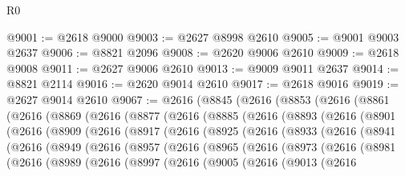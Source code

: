 \begin{lexlean}{R0}
\begin{coremodule}
@9001 := @2618 @9000
@9003 := @2627 @8998 @2610
@9005 := @9001 @9003 @2637
@9006 := @8821 @2096
@9008 := @2620 @9006 @2610
@9009 := @2618 @9008
@9011 := @2627 @9006 @2610
@9013 := @9009 @9011 @2637
@9014 := @8821 @2114
@9016 := @2620 @9014 @2610
@9017 := @2618 @9016
@9019 := @2627 @9014 @2610
@9067 := @2616
    (@8845
      (@2616
        (@8853
          (@2616
            (@8861
              (@2616
                (@8869
                  (@2616
                    (@8877
                      (@2616
                        (@8885
                          (@2616
                            (@8893
                              (@2616
                                (@8901
                                  (@2616
                                    (@8909
                                      (@2616
                                        (@8917
                                          (@2616
                                            (@8925
                                              (@2616
                                                (@8933
                                                  (@2616
                                                    (@8941
                                                      (@2616
                                                        (@8949
                                                          (@2616
                                                            (@8957
                                                              (@2616
                                                                (@8965
                                                                  (@2616
                                                                    (@8973
                                                                      (@2616
                                                                        (@8981
                                                                          (@2616
                                                                            (@8989
                                                                              (@2616
                                                                                (@8997
                                                                                  (@2616
                                                                                    (@9005
                                                                                      (@2616
                                                                                        (@9013
                                                                                          (@2616

\end{coremodule}
\end{lexlean}
